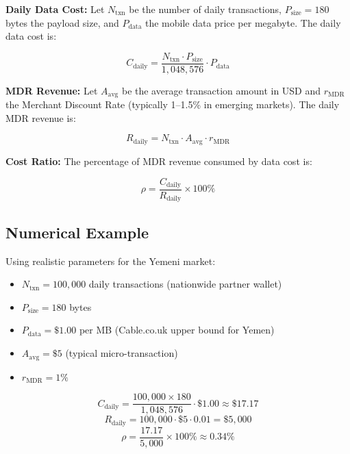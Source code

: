 \documentclass[conference,10pt]{IEEEtran}
\begin{document}
\textbf{Daily Data Cost:} Let $N_{\mathrm{txn}}$ be the number of daily transactions, $P_{\mathrm{size}} = 180$ bytes the payload size, and $P_{\mathrm{data}}$ the mobile data price per megabyte. The daily data cost is:

\begin{equation}
C_{\mathrm{daily}} = \frac{N_{\mathrm{txn}} \cdot P_{\mathrm{size}}}{1{,}048{,}576} \cdot P_{\mathrm{data}}
\label{eq:cost}
\end{equation}

\textbf{MDR Revenue:} Let $A_{\mathrm{avg}}$ be the average transaction amount in USD and $r_{\mathrm{MDR}}$ the Merchant Discount Rate (typically 1--1.5\% in emerging markets). The daily MDR revenue is:

\begin{equation}
R_{\mathrm{daily}} = N_{\mathrm{txn}} \cdot A_{\mathrm{avg}} \cdot r_{\mathrm{MDR}}
\label{eq:revenue}
\end{equation}

\textbf{Cost Ratio:} The percentage of MDR revenue consumed by data cost is:

\begin{equation}
\rho = \frac{C_{\mathrm{daily}}}{R_{\mathrm{daily}}} \times 100\%
\label{eq:ratio}
\end{equation}

\subsection{Numerical Example}

Using realistic parameters for the Yemeni market:

\begin{itemize}
\item $N_{\mathrm{txn}} = 100{,}000$ daily transactions (nationwide partner wallet)
\item $P_{\mathrm{size}} = 180$ bytes
\item $P_{\mathrm{data}} = \$1.00$ per MB (Cable.co.uk upper bound for Yemen)
\item $A_{\mathrm{avg}} = \$5$ (typical micro-transaction)
\item $r_{\mathrm{MDR}} = 1\%$
\end{itemize}

\begin{equation*}
C_{\mathrm{daily}} = \frac{100{,}000 \times 180}{1{,}048{,}576} \cdot \$1.00 \approx \$17.17
\end{equation*}
\begin{equation*}
R_{\mathrm{daily}} = 100{,}000 \cdot \$5 \cdot 0.01 = \$5{,}000
\end{equation*}
\begin{equation*}
\rho = \frac{17.17}{5{,}000} \times 100\% \approx 0.34\%
\end{equation*}
\end{document}
